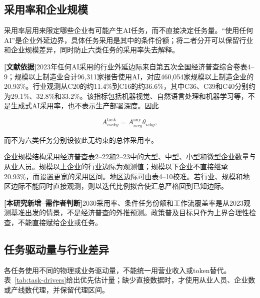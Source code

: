 \documentclass[preprint]{elsarticle}
\newcommand{\literature}{\textcolor{blue!70!black}{\textbf{[文献依据]}}}
\newcommand{\newwork}{\textcolor{orange!80!black}{\textbf{[本研究新增--需作者判断]}}}
\begin{document}
\subsection{采用率和企业规模}

采用率层用来限定哪些企业有可能产生AI任务，而不直接决定任务量。“使用任何AI”是企业外延边界，具体任务采用是其中的条件份额；将二者分开可以保留行业和企业规模差异，同时防止六类任务的采用率失去解释。

\literature 2023年任何AI采用的行业外延边际来自第五次全国经济普查综合卷表4--9；规模以上制造业合计96,311家报告使用AI，对应460,054家规模以上制造企业的20.93\%。行业观测从C20的约11.4\%到C16的约36.6\%，其中C36、C39和C40分别约为29.1\%、32.8\%和33.2\%\cite{nbs2023}。该指标包括机器视觉、自然语言处理和机器学习等，不是生成式AI采用率，也不表示生产部署深度。因此

\begin{equation}
 A^{\mathrm{task}}_{isrky}
 =A^{\mathrm{any}}_{isry}\theta_{isky},
 \label{eq:task-adoption}
\end{equation}

而不为六类任务分别设彼此无约束的总体采用率。

企业规模结构采用经济普查表2--22和2--23中的大型、中型、小型和微型企业数量与从业人员。规模以上企业的行业边际为观测值；规模以下企业不直接继承20.93\%，而设置更宽的采用区间。地区边际可由表4--10校准。若行业、规模和地区边际不能同时直接观测，则以迭代比例拟合使汇总严格回到已知边际。

\newwork 2030采用率、条件任务份额和工作流覆盖率是从2023观测基准出发的情景，不是经济普查的外推预测。政策普及目标只作为上界合理性检查，不能直接赋给企业或任务。

\subsection{任务驱动量与行业差异}

各任务使用不同的物理或业务驱动量，不能统一用营业收入或token替代。表~\ref{tab:task-drivers}给出优先估计量；缺少直接数据时，才使用从业人员、企业数或产线数代理，并保留代理区间。
\end{document}
